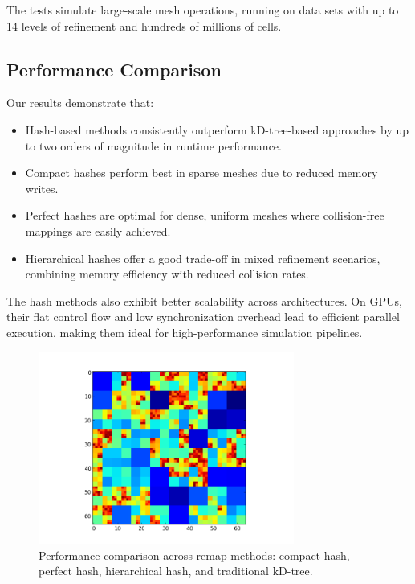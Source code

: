 The tests simulate large-scale mesh operations, running on data sets with up to 14 levels of refinement and hundreds of millions of cells.

\subsection{Performance Comparison}

Our results demonstrate that:
\begin{itemize}
  \item Hash-based methods consistently outperform kD-tree-based approaches by up to two orders of magnitude in runtime performance.
  \item Compact hashes perform best in sparse meshes due to reduced memory writes.
  \item Perfect hashes are optimal for dense, uniform meshes where collision-free mappings are easily achieved.
  \item Hierarchical hashes offer a good trade-off in mixed refinement scenarios, combining memory efficiency with reduced collision rates.
\end{itemize}

The hash methods also exhibit better scalability across architectures. On GPUs, their flat control flow and low synchronization overhead lead to efficient parallel execution, making them ideal for high-performance simulation pipelines.

\begin{figure}[h]
  \centering
  \includegraphics[width=0.75\textwidth]{./images/figure_p13_1.png}
  \caption{Performance comparison across remap methods: compact hash, perfect hash, hierarchical hash, and traditional kD-tree.}
  \label{fig:performance_comparison}
\end{figure}
